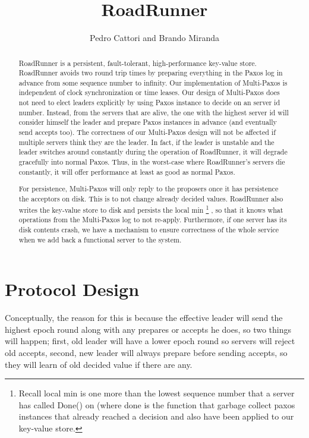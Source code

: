 \documentclass[a4paper]{article}
\title{RoadRunner}
\author{Pedro Cattori and Brando Miranda}
\begin{document}
\maketitle

\begin{abstract}
RoadRunner is a persistent, fault-tolerant, high-performance key-value store. 
RoadRunner avoids two round trip times by preparing everything in the Paxos log in advance from some sequence number to infinity. 
Our implementation of Multi-Paxos is independent of clock synchronization or time leases.
Our design of Multi-Paxos does not need to elect leaders explicitly by using Paxos instance to decide on an server id number.
Instead, from the servers that are alive, the one with the highest server id will consider himself the leader and prepare Paxos instances in advance (and eventually send accepts too).
The correctness of our Multi-Paxos design will not be affected if multiple servers think they are the leader. 
In fact, if the leader is unstable and the leader switches around constantly during the operation of RoadRunner, it will degrade gracefully into normal Paxos. 
Thus, in the worst-case where RoadRunner's servers die constantly, it will offer performance at least as good as normal Paxos.

\indent For persistence, Multi-Paxos will only reply to the proposers once it has persistence the acceptors on disk. This is to not change already decided values. 
RoadRunner also writes the key-value store to disk and persists the local min
\footnote{Recall local min is one more than the lowest sequence number that a server has called Done() on (where done is the function that garbage collect paxos instances that already reached a decision and also have been applied to our key-value store.}
, so that it knows what operations from the Multi-Paxos log to not re-apply. 
Furthermore, if one server has its disk contents crash, we have a mechanism to ensure correctness of the whole service when we add back a functional server to the system.
\end{abstract}

\section{Protocol Design}

Conceptually, the reason for this is because the effective leader will send the highest epoch round along with any prepares or accepts he does, so two things will happen; first, old leader will have a lower epoch round so servers will reject old accepts, second, new leader will always prepare before sending accepts, so they will learn of old decided value if there are any. 
\end{document}
